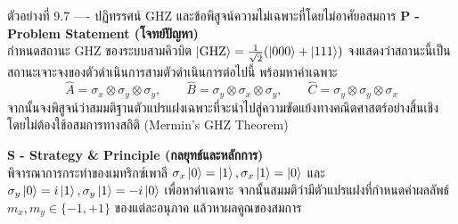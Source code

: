 \begin{psctbox}{ตัวอย่างที่ 9.7 ---- ปฏิทรรศน์ GHZ และข้อพิสูจน์ความไม่เฉพาะที่โดยไม่อาศัยอสมการ}
\noindent\textbf{P - Problem Statement (โจทย์ปัญหา)} \\
กำหนดสถานะ GHZ ของระบบสามคิวบิต $\ket{\text{GHZ}} = \frac{1}{\sqrt{2}}(\ket{000} + \ket{111})$ จงแสดงว่าสถานะนี้เป็นสถานะเจาะจงของตัวดำเนินการสามตัวดำเนินการต่อไปนี้ พร้อมหาค่าเฉพาะ
\begin{equation}
\hat{A} = \sigma_x \otimes \sigma_y \otimes \sigma_y, \qquad \hat{B} = \sigma_y \otimes \sigma_x \otimes \sigma_y, \qquad \hat{C} = \sigma_y \otimes \sigma_y \otimes \sigma_x
\end{equation}
จากนั้นจงพิสูจน์ว่าสมมติฐานตัวแปรแฝงเฉพาะที่จะนำไปสู่ความขัดแย้งทางคณิตศาสตร์อย่างสิ้นเชิงโดยไม่ต้องใช้อสมการทางสถิติ (Mermin's GHZ Theorem)

\vspace{4pt}
\noindent\textbf{S - Strategy \& Principle (กลยุทธ์และหลักการ)} \\
พิจารณาการกระทำของเมทริกซ์เพาลี $\sigma_x\ket{0} = \ket{1}, \sigma_x\ket{1} = \ket{0}$ และ $\sigma_y\ket{0} = i\ket{1}, \sigma_y\ket{1} = -i\ket{0}$ เพื่อหาค่าเฉพาะ จากนั้นสมมติว่ามีตัวแปรแฝงที่กำหนดค่าผลลัพธ์ $m_x, m_y \in \{-1, +1\}$ ของแต่ละอนุภาค แล้วหาผลคูณของสมการ


\end{psctbox}

